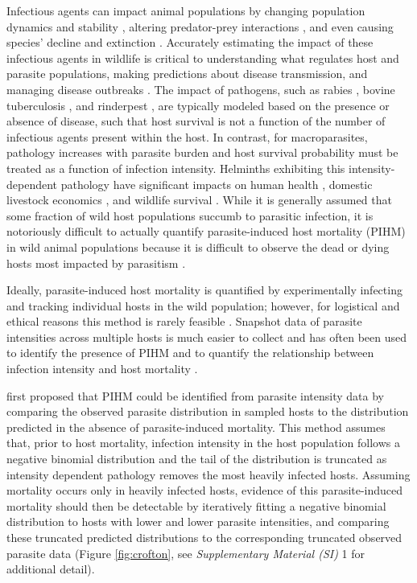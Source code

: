 \documentclass[12pt, a4paper]{article}
\begin{document}
Infectious agents can impact animal populations by changing
population dynamics and stability \citep{Dobson1992,Tompkins2002}, altering predator-prey interactions \citep{Joly2004}, and
even causing species' decline and extinction \citep{DeCastro2005a,McCallum2012b}. Accurately estimating the impact
of these infectious agents in wildlife is critical to understanding what
regulates host and parasite populations, making predictions about disease
transmission, and managing disease outbreaks \citep{Langwig2015}. The impact of pathogens, such as rabies \citep{Coyne1989}, bovine tuberculosis \citep{Cox2005}, and
rinderpest \citep{Tille1991}, are typically modeled based on the presence or absence of disease, such that host survival is not a function of the number of infectious agents present within the host.  In contrast, for macroparasites, pathology increases with parasite burden and host survival probability must be treated as a function of infection intensity. Helminths exhibiting this intensity-dependent pathology have significant impacts on human health \citep{Brooker2004}, domestic livestock economics \citep{Roeber2013}, and wildlife survival \citep{Kirk2003,Logiudice2003}. While it is generally assumed that some fraction of wild host populations succumb to parasitic infection, it is notoriously difficult to actually quantify parasite-induced host mortality (PIHM) in wild animal populations because it is difficult to observe the dead or dying hosts most impacted by parasitism \citep{McCallum2000a}.

Ideally, parasite-induced host mortality is
quantified by experimentally infecting and tracking individual hosts in the
wild population; however, for logistical and ethical reasons this method is
rarely feasible \citep{McCallum2000a}. Snapshot data of parasite intensities across multiple hosts is much easier to collect and has
often been used to identify the presence of PIHM \citep{Crofton1971a,Lester1977,Lester1984,Lanciani1989,Royce1990,Ferguson2011} and to quantify the
relationship between infection intensity and host mortality \citep{Adjei1986}.

\cite{Crofton1971a} first proposed that PIHM could be identified from parasite intensity data by comparing the
observed parasite distribution in sampled hosts to the distribution
predicted in the absence of parasite-induced mortality. This method
assumes that, prior to host mortality, infection intensity in the host population follows a negative binomial distribution and the tail of the distribution is truncated as intensity dependent pathology removes the most heavily infected hosts. Assuming mortality occurs only in heavily infected hosts, evidence of this parasite-induced mortality should then be detectable by iteratively
fitting a negative binomial distribution to hosts with lower and lower parasite intensities, and comparing these truncated predicted distributions to the corresponding truncated observed parasite data (Figure \ref{fig:crofton}, see \emph{Supplementary Material (SI)} 1 for additional detail).
\end{document}
